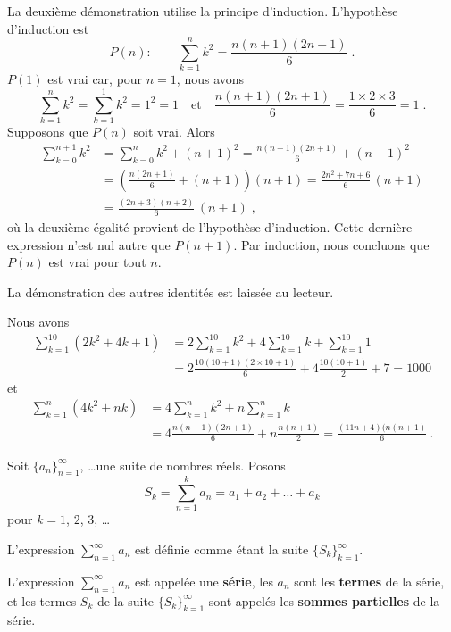 {\begin{rmk}[\theory]
 La deuxième démonstration utilise la principe d'induction.
L'hypothèse d'induction est
\[
P(n) : \qquad \sum_{k=1}^n k^2 = \frac{n(n+1)(2n+1)}{6} \; .
\]
$P(1)$ est vrai car, pour $n=1$, nous avons
\[
\sum_{k=1}^n k^2 = \sum_{k=1}^1 k^2 = 1^2 = 1 \quad \text{et} \quad
\frac{n(n+1)(2n+1)}{6} = \frac{1 \times 2 \times 3}{6} = 1 \; .
\]
Supposons que $P(n)$ soit vrai.  Alors
\begin{align*}
\sum_{k=0}^{n+1} k^2 &= \sum_{k=0}^n k^2 + (n+1)^2
= \frac{n(n+1)(2n+1)}{6} + (n+1)^2 \\
&= \left(\frac{n(2n+1)}{6} + (n+1)\right) (n+1)
= \frac{2n^2 + 7n + 6}{6}\,(n+1) \\
&= \frac{(2n+3)(n+2)}{6}\,(n+1) \; ,
\end{align*}
où la deuxième égalité provient de l'hypothèse d'induction.  Cette
dernière expression n'est nul autre que $P(n+1)$.  Par induction, nous
concluons que $P(n)$ est vrai pour tout $n$.

La démonstration des autres identités est laissée au lecteur. 
\end{rmk}

\begin{egg}[\theory]
Nous avons
\begin{align*}
\sum_{k=1}^{10} (2k^2 + 4 k + 1) &= 
2\sum_{k=1}^{10} k^2 + 4 \sum_{k=1}^{10} k + \sum_{k=1}^{10} 1 \\
&= 2 \frac{10(10+1)(2\times 10 +1)}{6} + 4 \frac{10(10+1)}{2} + 7
= 1000
\end{align*}
et
\begin{align*}
\sum_{k=1}^n (4k^2 + n k) &= 4\sum_{k=1}^n k^2 + n \sum_{k=1}^n k \\
&= 4 \frac{n(n+1)(2n+1)}{6} + n \frac{n(n+1)}{2}
= \frac{(11n+4)(n(n+1)}{6} \ .
\end{align*}
\end{egg}

\begin{focus}{\dfn}
Soit $\{ a_n\}_{n=1}^\infty$, \ldots une suite de nombres réels.  Posons
\[
S_k = \sum_{n=1}^k a_n = a_1 + a_2 + \ldots + a_k
\]
pour $k=1$, $2$, $3$, \ldots

L'expression $\displaystyle \sum_{n=1}^\infty a_n$ est définie comme
étant la suite $\{S_k\}_{k=1}^\infty$.

L'expression $\displaystyle \sum_{n=1}^\infty a_n$ est appelée une
{\bfseries série}, les $a_n$ sont les
{\bfseries termes} de la série, et les termes
$S_k$ de la suite $\displaystyle \{S_k\}_{k=1}^\infty$ sont appelés
les {\bfseries sommes partielles} de la
série.


\end{focus}}
